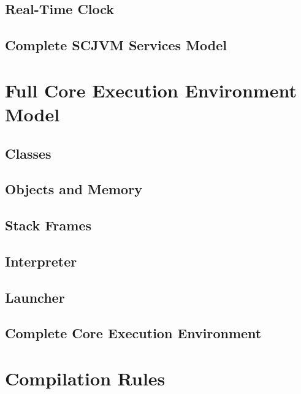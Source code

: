 \documentclass[a4paper,10pt]{report}
\theoremstyle{definition}
\begin{document}
\section{Real-Time Clock}


\section{Complete SCJVM Services Model}


\chapter{Full Core Execution Environment Model}
\label{full-cee-model}

\section{Classes}


\section{Objects and Memory}


\section{Stack Frames}


\section{Interpreter}


\section{Launcher}


\section{Complete Core Execution Environment}


\chapter{Compilation Rules}

\end{document}
